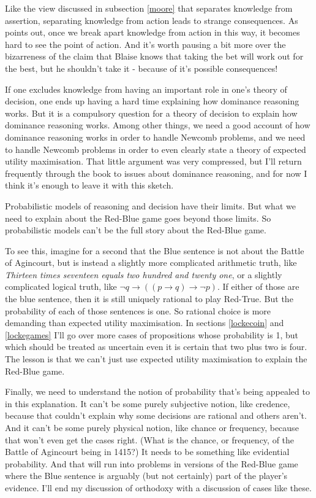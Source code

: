 \documentclass[11pt,]{book}
\begin{document}
Like the view discussed in subsection \ref{moore} that separates knowledge from assertion, separating knowledge from action leads to strange consequences. As \citet{Williamson2005} points out, once we break apart knowledge from action in this way, it becomes hard to see the point of action. And it's worth pausing a bit more over the bizarreness of the claim that Blaise knows that taking the bet will work out for the best, but he shouldn't take it - because of it's possible consequences!

If one excludes knowledge from having an important role in one's theory of decision, one ends up having a hard time explaining how dominance reasoning works. But it is a compulsory question for a theory of decision to explain how dominance reasoning works. Among other things, we need a good account of how dominance reasoning works in order to handle Newcomb problems, and we need to handle Newcomb problems in order to even clearly state a theory of expected utility maximisation. That little argument was very compressed, but I'll return frequently through the book to issues about dominance reasoning, and for now I think it's enough to leave it with this sketch.

Probabilistic models of reasoning and decision have their limits. But what we need to explain about the Red-Blue game goes beyond those limits. So probabilistic models can't be the full story about the Red-Blue game.

To see this, imagine for a second that the Blue sentence is not about the Battle of Agincourt, but is instead a slightly more complicated arithmetic truth, like \emph{Thirteen times seventeen equals two hundred and twenty one}, or a slightly complicated logical truth, like \(\neg q \rightarrow ((p \rightarrow q) \rightarrow \neg p)\). If either of those are the blue sentence, then it is still uniquely rational to play Red-True. But the probability of each of those sentences is one. So rational choice is more demanding than expected utility maximisation. In sections \ref{lockecoin} and \ref{lockegames} I'll go over more cases of propositions whose probability is 1, but which should be treated as uncertain even it is certain that two plus two is four. The lesson is that we can't just use expected utility maximisation to explain the Red-Blue game.

Finally, we need to understand the notion of probability that's being appealed to in this explanation. It can't be some purely subjective notion, like credence, because that couldn't explain why some decisions are rational and others aren't. And it can't be some purely physical notion, like chance or frequency, because that won't even get the cases right. (What is the chance, or frequency, of the Battle of Agincourt being in 1415?) It needs to be something like evidential probability. And that will run into problems in versions of the Red-Blue game where the Blue sentence is arguably (but not certainly) part of the player's evidence. I'll end my discussion of orthodoxy with a discussion of cases like these.
\end{document}
